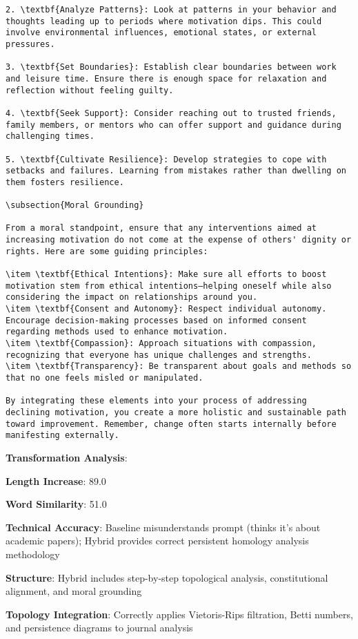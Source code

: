 \documentclass[11pt,a4paper]{article}
\begin{document}
\begin{verbatim}
2. \textbf{Analyze Patterns}: Look at patterns in your behavior and thoughts leading up to periods where motivation dips. This could involve environmental influences, emotional states, or external pressures.

3. \textbf{Set Boundaries}: Establish clear boundaries between work and leisure time. Ensure there is enough space for relaxation and reflection without feeling guilty.

4. \textbf{Seek Support}: Consider reaching out to trusted friends, family members, or mentors who can offer support and guidance during challenging times.

5. \textbf{Cultivate Resilience}: Develop strategies to cope with setbacks and failures. Learning from mistakes rather than dwelling on them fosters resilience.

\subsection{Moral Grounding}

From a moral standpoint, ensure that any interventions aimed at increasing motivation do not come at the expense of others' dignity or rights. Here are some guiding principles:

\item \textbf{Ethical Intentions}: Make sure all efforts to boost motivation stem from ethical intentions—helping oneself while also considering the impact on relationships around you.
\item \textbf{Consent and Autonomy}: Respect individual autonomy. Encourage decision-making processes based on informed consent regarding methods used to enhance motivation.
\item \textbf{Compassion}: Approach situations with compassion, recognizing that everyone has unique challenges and strengths.
\item \textbf{Transparency}: Be transparent about goals and methods so that no one feels misled or manipulated.

By integrating these elements into your process of addressing declining motivation, you create a more holistic and sustainable path toward improvement. Remember, change often starts internally before manifesting externally.
\end{verbatim}

\textbf{Transformation Analysis}:
\item \textbf{Length Increase}: 89.0%
\item \textbf{Word Similarity}: 51.0%
\item \textbf{Technical Accuracy}: Baseline misunderstands prompt (thinks it's about academic papers); Hybrid provides correct persistent homology analysis methodology
\item \textbf{Structure}: Hybrid includes step-by-step topological analysis, constitutional alignment, and moral grounding
\item \textbf{Topology Integration}: Correctly applies Vietoris-Rips filtration, Betti numbers, and persistence diagrams to journal analysis
\end{document}
